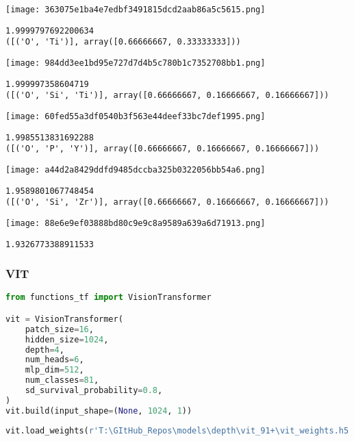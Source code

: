 \texttt{[image: 363075e1ba4e7edbf3491815dcd2aab86a5c5615.png]}

\begin{lstlisting}
1.9999797692200634
([('O', 'Ti')], array([0.66666667, 0.33333333]))
\end{lstlisting}

\texttt{[image: 984dd3ee1bd95e727d7d4b5c780b1c7352708bb1.png]}

\begin{lstlisting}
1.999997358604719
([('O', 'Si', 'Ti')], array([0.66666667, 0.16666667, 0.16666667]))
\end{lstlisting}

\texttt{[image: 60fed55a3df0540b3f563e44deef33bc7def1995.png]}

\begin{lstlisting}
1.9985513831692288
([('O', 'P', 'Y')], array([0.66666667, 0.16666667, 0.16666667]))
\end{lstlisting}

\texttt{[image: a44d2a8429ddfd9485dccba325b0322056bb54a6.png]}

\begin{lstlisting}
1.9589801067748454
([('O', 'Si', 'Zr')], array([0.66666667, 0.16666667, 0.16666667]))
\end{lstlisting}

\texttt{[image: 88e6e9ef03888bd80c9e9c8a9589a639a6d71913.png]}

\begin{lstlisting}
1.9326773388911533
\end{lstlisting}

\hypertarget{vit}{%
\subsubsection{VIT}\label{vit}}

\begin{lstlisting}[language=Python]
from functions_tf import VisionTransformer

vit = VisionTransformer(
    patch_size=16,
    hidden_size=1024,
    depth=4,
    num_heads=6,
    mlp_dim=512,
    num_classes=81,
    sd_survival_probability=0.8,
)
vit.build(input_shape=(None, 1024, 1))
\end{lstlisting}

\begin{lstlisting}[language=Python]
vit.load_weights(r'T:\GItHub_Repos\models\depth\vit_91+\vit_weights.h5')
\end{lstlisting}

